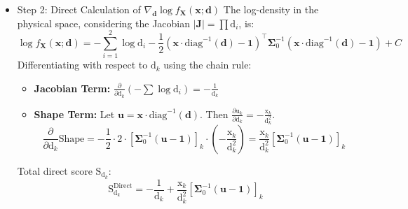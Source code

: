 \documentclass[12pt,a4paper, fleqn]{article}
\begin{document}
\begin{itemize}
    \item Step 2: Direct Calculation of $\nabla_{\mathrm{\mathbf{d}}} \log f_{\mathrm{\mathbf{X}}}(\mathrm{\mathbf{x}}; \mathrm{\mathbf{d}})$
    The log-density in the physical space, considering the Jacobian $|\mathbf{J}| = \prod \mathrm{d}_i$, is:
    \begin{equation}
        \log f_{\mathrm{\mathbf{X}}}(\mathrm{\mathbf{x}}; \mathrm{\mathbf{d}}) = -\sum_{i=1}^{2} \log \mathrm{d}_i - \frac{1}{2}(\mathrm{\mathbf{x}}\cdot\mathrm{diag}^{-1}(\mathbf{d})-\mathbf{1})^\top \boldsymbol{\Sigma}_0^{-1} (\mathrm{\mathbf{x}}\cdot\mathrm{diag}^{-1}(\mathrm{\mathbf{d}})-\mathbf{1}) + C
    \end{equation}
    Differentiating with respect to $\mathrm{d}_k$ using the chain rule:
    \begin{itemize}
        \item \textbf{Jacobian Term:} $\frac{\partial}{\partial \mathrm{d}_k} (-\sum \log \mathrm{d}_i) = -\frac{1}{\mathrm{d}_k}$
        \item \textbf{Shape Term:} Let $\mathbf{u} = \mathrm{\mathbf{x}}\cdot\mathrm{diag}^{-1}(\mathrm{\mathbf{d}})$. Then $\frac{\partial \mathrm{u}_k}{\partial \mathrm{d}_k} = -\frac{\mathrm{x}_k}{\mathrm{d}_k^2}$.
        \begin{equation}
            \frac{\partial}{\partial \mathrm{d}_k} \text{Shape} = -\frac{1}{2} \cdot 2 \cdot \left[ \boldsymbol{\Sigma}_0^{-1}(\mathbf{u}-\mathbf{1}) \right]_k \cdot \left( -\frac{\mathrm{x}_k}{\mathrm{d}_k^2} \right) = \frac{\mathrm{x}_k}{\mathrm{d}_k^2} \left[ \boldsymbol{\Sigma}_0^{-1}(\mathbf{u}-\mathbf{1}) \right]_k
        \end{equation}
    \end{itemize}
    Total direct score $\mathrm{S}_{\mathrm{d}_k}$:
    \begin{equation}
        \mathrm{S}_{\mathrm{d}_k}^{\text{Direct}} = -\frac{1}{\mathrm{d}_k} + \frac{\mathrm{x}_k}{\mathrm{d}_k^2} \left[ \boldsymbol{\Sigma}_0^{-1}(\mathbf{u}-\mathbf{1}) \right]_k
    \end{equation}
\\


\end{itemize}
\end{document}
